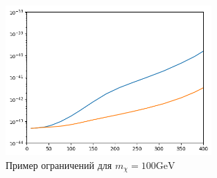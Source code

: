 \begin{figure}[!h]
	\centering
	\includegraphics[width=0.7\textwidth]{images/Constrains.png}
	\caption{Пример ограничений для $m_{\chi} = 100 \text{GeV}$}
\end{figure}